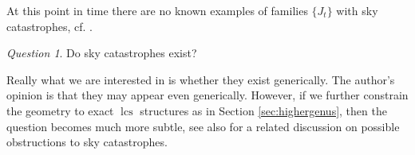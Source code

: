 \documentclass{amsart}
\numberwithin{equation}{section}
\newtheorem{conjecture}{Conjecture}
\theoremstyle{definition}
\theoremstyle{remark}
\newtheorem{question}{Question}
\DeclareMathOperator{\lcs}{lcs}
\DeclareMathOperator{\lcsm}{lcsm}
\begin{document}
   At this point in time there are no known examples of  families $\{ J _{t}  \}$ with sky catastrophes, cf. \cite{citeFullerBlueSky}. 
   \begin{question}
   Do sky catastrophes exist? 
\end{question}
Really what we are interested in is whether they exist generically. 
The author's opinion is that they may appear even generically. However, if we further constrain the geometry to exact $\lcs$ structures as in Section \ref{sec:highergenus}, then the question becomes much more subtle, see also \cite{citeSavelyevFuller} for a related discussion on possible obstructions to sky catastrophes.
\end{document}
